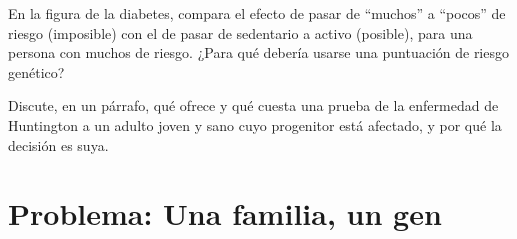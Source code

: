 \begin{exercise}[$\star\star\star$]\label{exo:g11:genes-and-disease:14}
En la figura de la diabetes, compara el efecto de pasar de ``muchos'' a
``pocos''  de riesgo (imposible) con el de pasar de sedentario a
activo (posible), para una persona con muchos  de riesgo. ¿Para
qué debería usarse una puntuación de riesgo genético?
\end{exercise}

\begin{exercise}[$\star\star\star$]\label{exo:g11:genes-and-disease:15}
Discute, en un párrafo, qué ofrece y qué cuesta una prueba de la
enfermedad de Huntington a un adulto joven y sano cuyo progenitor está
afectado, y por qué la decisión es suya.
\end{exercise}

\section{Problema: Una familia, un gen}

